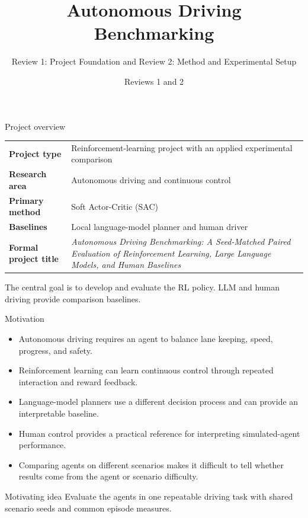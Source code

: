 \documentclass[aspectratio=169,10pt]{beamer}
\title[Autonomous Driving Benchmarking]{Autonomous Driving Benchmarking}
\subtitle{Review 1: Project Foundation and Review 2: Method and Experimental Setup}
\date{Reviews 1 and 2}
\begin{document}
\begin{frame}
  \titlepage
\end{frame}

\begin{frame}{Project overview}
\small
\begin{tabularx}{\textwidth}{>{\bfseries}p{} X}
\toprule
Project type & Reinforcement-learning project with an applied experimental comparison \\
Research area & Autonomous driving and continuous control \\
Primary method & Soft Actor-Critic (SAC) \\
Baselines & Local language-model planner and human driver \\
Formal project title & \textit{Autonomous Driving Benchmarking: A Seed-Matched Paired Evaluation of Reinforcement Learning, Large Language Models, and Human Baselines} \\
\bottomrule
\end{tabularx}
\vspace{0.7em}
The central goal is to develop and evaluate the RL policy. LLM and human driving provide comparison baselines.
\end{frame}

\begin{frame}{Motivation}
\begin{itemize}
  \item Autonomous driving requires an agent to balance lane keeping, speed, progress, and safety.
  \item Reinforcement learning can learn continuous control through repeated interaction and reward feedback.
  \item Language-model planners use a different decision process and can provide an interpretable baseline.
  \item Human control provides a practical reference for interpreting simulated-agent performance.
  \item Comparing agents on different scenarios makes it difficult to tell whether results come from the agent or scenario difficulty.
\end{itemize}
\begin{block}{Motivating idea}
Evaluate the agents in one repeatable driving task with shared scenario seeds and common episode measures.
\end{block}
\end{frame}
\end{document}
